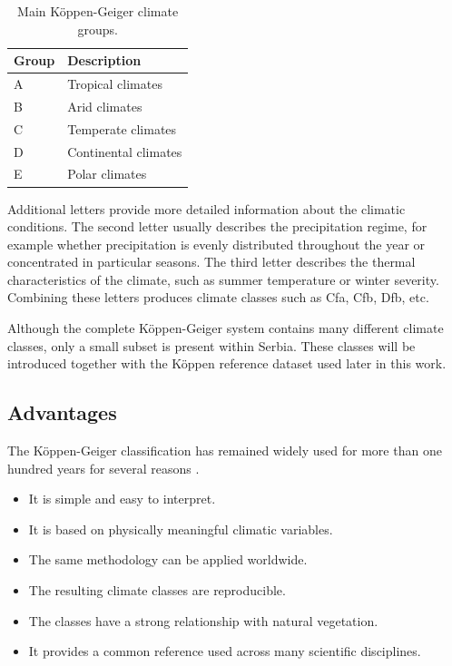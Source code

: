 \documentclass[11pt]{article}
\begin{document}
\begin{table}[h]
\centering
\begin{tabular}{ll}
\hline
Group & Description \\
\hline
A & Tropical climates \\
B & Arid climates \\
C & Temperate climates \\
D & Continental climates \\
E & Polar climates \\
\hline
\end{tabular}
\caption{Main Köppen-Geiger climate groups.}
\end{table}

Additional letters provide more detailed information about the climatic conditions. The second letter usually describes the precipitation regime, for example whether precipitation is evenly distributed throughout the year or concentrated in particular seasons. The third letter describes the thermal characteristics of the climate, such as summer temperature or winter severity. Combining these letters produces climate classes such as Cfa, Cfb, Dfb, etc.

Although the complete Köppen-Geiger system contains many different climate classes, only a small subset is present within Serbia. These classes will be introduced together with the Köppen reference dataset used later in this work.

\subsection{Advantages}

The Köppen-Geiger classification has remained widely used for more than one hundred years for several reasons \cite{peel2007,beck2018}.

\begin{itemize}
    \item It is simple and easy to interpret.
    \item It is based on physically meaningful climatic variables.
    \item The same methodology can be applied worldwide.
    \item The resulting climate classes are reproducible.
    \item The classes have a strong relationship with natural vegetation.
    \item It provides a common reference used across many scientific disciplines.
\end{itemize}
\end{document}
